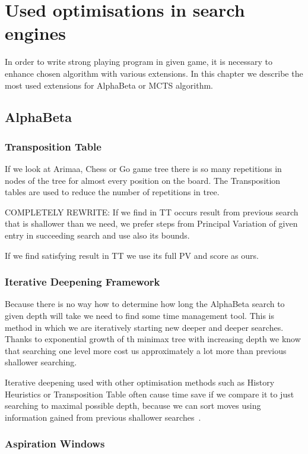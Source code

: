 \chapter{Used optimisations in search engines}

In order to write strong playing program in given game, it is necessary to
enhance chosen algorithm with various extensions. In this chapter we describe
the most used extensions for AlphaBeta or MCTS algorithm.

\section{AlphaBeta}
\subsection{Transposition Table}\label{AlphaBeta:TT}
If we look at Arimaa, Chess or Go game tree there is so many repetitions in
nodes of the tree for almost every position on the board. The Transposition tables
are used to reduce the number of repetitions in tree.

COMPLETELY REWRITE: If we find in TT occurs result from previous search that is
shallower than we need, we prefer steps from Principal Variation of given entry
in succeeding search and use also its bounds.

If we find satisfying result in TT we use its full PV and score as ours.

\subsection{Iterative Deepening Framework}
Because there is no way how to determine how long the AlphaBeta search to given
depth will take we need to find some time management tool. This is method in
which we are iteratively starting new deeper and deeper searches. Thanks to
exponential growth of th minimax tree with increasing depth we know that
searching one level more cost us approximately a lot more than previous
shallower searching.

Iterative deepening used with other optimisation methods such as History
Heuristics or Transposition Table often cause time save if we compare it to
just searching to maximal possible depth, because we can sort moves using
information gained from previous shallower searches~\cite{COX}.

\subsection{Aspiration Windows}

